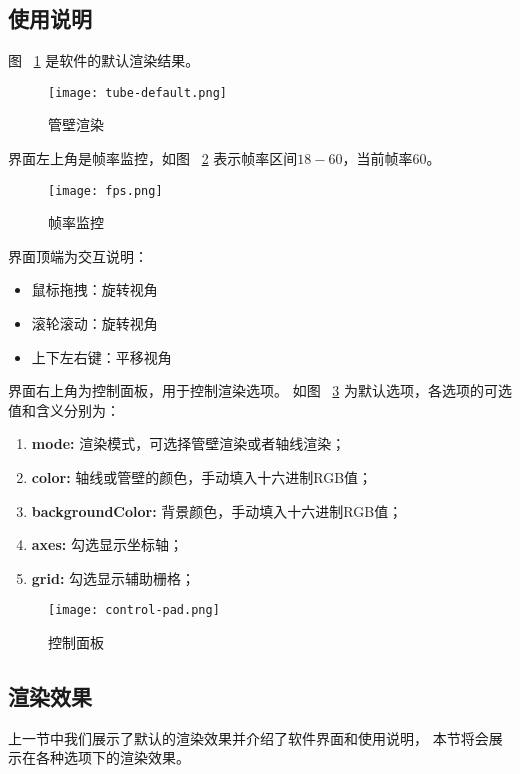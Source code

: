 \subsection{使用说明}

图 ~\ref{fig:tube-default} 是软件的默认渲染结果。
\begin{figure}[H]
\centering
\texttt{[image: tube-default.png]}
\caption{管壁渲染}
\label{fig:tube-default}
\end{figure}

界面左上角是帧率监控，如图 ~\ref{fig:fps} 表示帧率区间$18-60$，当前帧率$60$。

\begin{figure}[H]
\centering
\texttt{[image: fps.png]}
\caption{帧率监控}
\label{fig:fps}
\end{figure}

界面顶端为交互说明：

\begin{itemize}
\item 鼠标拖拽：旋转视角
\item 滚轮滚动：旋转视角
\item 上下左右键：平移视角
\end{itemize}

界面右上角为控制面板，用于控制渲染选项。
如图 ~\ref{fig:control-pad} 为默认选项，各选项的可选值和含义分别为：

\begin{enumerate}
\item \textbf{mode: }渲染模式，可选择管壁渲染或者轴线渲染；
\item \textbf{color: }轴线或管壁的颜色，手动填入十六进制RGB值；
\item \textbf{backgroundColor: }背景颜色，手动填入十六进制RGB值；
\item \textbf{axes: }勾选显示坐标轴；
\item \textbf{grid: }勾选显示辅助栅格；
\end{enumerate}

\begin{figure}[H]
\centering
\texttt{[image: control-pad.png]}
\caption{控制面板}
\label{fig:control-pad}
\end{figure}

\subsection{渲染效果}
上一节中我们展示了默认的渲染效果并介绍了软件界面和使用说明，
本节将会展示在各种选项下的渲染效果。

